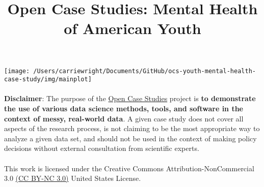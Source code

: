 \documentclass[
]{article}
\title{Open Case Studies: Mental Health of American Youth}
\author{}
\date{\vspace{-2.5em}}
\begin{document}
\maketitle

{
\setcounter{tocdepth}{2}
\tableofcontents
}
\hypertarget{section}{%
\paragraph{}\label{section}}

\begin{center}\texttt{[image: /Users/carriewright/Documents/GitHub/ocs-youth-mental-health-case-study/img/mainplot]} \end{center}

\hypertarget{section-1}{%
\paragraph{}\label{section-1}}

\hypertarget{section-2}{%
\paragraph{}\label{section-2}}

\textbf{Disclaimer}: The purpose of the
\href{https://opencasestudies.github.io}{Open Case Studies} project is
\textbf{to demonstrate the use of various data science methods, tools,
and software in the context of messy, real-world data}. A given case
study does not cover all aspects of the research process, is not
claiming to be the most appropriate way to analyze a given data set, and
should not be used in the context of making policy decisions without
external consultation from scientific experts.

\hypertarget{section-3}{%
\paragraph{}\label{section-3}}

\hypertarget{section-4}{%
\paragraph{}\label{section-4}}

This work is licensed under the Creative Commons
Attribution-NonCommercial 3.0
\href{https://creativecommons.org/licenses/by-nc/3.0/us/}{(CC BY-NC
3.0)} United States License.

\hypertarget{section-5}{%
\paragraph{}\label{section-5}}
\end{document}
